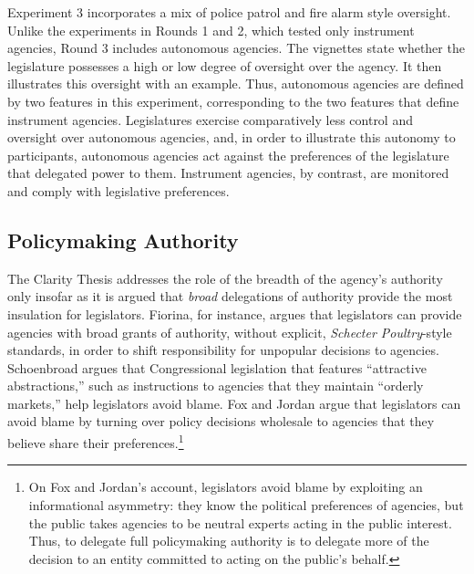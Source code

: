 \documentclass{article}
\begin{document}
Experiment 3 incorporates a mix of police patrol and fire alarm style oversight. Unlike the experiments in Rounds 1 and 2, which tested only instrument agencies, Round 3 includes autonomous agencies. The vignettes state whether the legislature possesses a high or low degree of oversight over the agency. It then illustrates this oversight with an example. Thus, autonomous agencies are defined by two features in this experiment, corresponding to the two features that define instrument agencies. Legislatures exercise comparatively less control and oversight over autonomous agencies, and, in order to illustrate this autonomy to participants, autonomous agencies act against the preferences of the legislature that delegated power to them. Instrument agencies, by contrast, are monitored and comply with legislative preferences. 

\subsection{Policymaking Authority}

The Clarity Thesis addresses the role of the breadth of the agency's authority only insofar as it is argued that \emph{broad} delegations of authority provide the most insulation for legislators. Fiorina, for instance, argues that legislators can provide agencies with broad grants of authority, without explicit, \emph{Schecter Poultry}-style standards, in order to shift responsibility for unpopular decisions to agencies. Schoenbroad argues that Congressional legislation that features ``attractive abstractions,'' such as instructions to agencies that they maintain ``orderly markets,'' help legislators avoid blame. Fox and Jordan argue that legislators can avoid blame by turning over policy decisions wholesale to agencies that they believe share their preferences.\footnote{On Fox and Jordan's account, legislators avoid blame by exploiting an informational asymmetry: they know the political preferences of agencies, but the public takes agencies to be neutral experts acting in the public interest. Thus, to delegate full policymaking authority is to delegate more of the decision to an entity committed to acting on the public's behalf.} 
\end{document}
